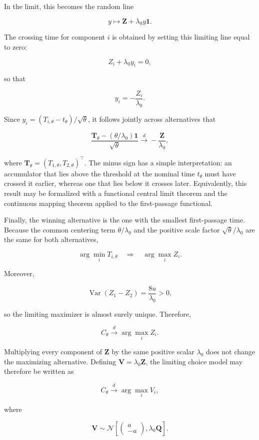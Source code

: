\documentclass[
  man,
  floatsintext,
  longtable,
  a4paper,
  nolmodern,
  notxfonts,
  notimes,
  colorlinks=true,linkcolor=blue,citecolor=blue,urlcolor=blue]{apa7}
\begin{document}
In the limit, this becomes the random line

\[
y\mapsto
\mathbf Z+\lambda_0y\mathbf 1.
\]

The crossing time for component \(i\) is obtained by setting this
limiting line equal to zero:

\[
Z_i+\lambda_0y_i=0,
\]

so that

\[
y_i=-\frac{Z_i}{\lambda_0}.
\]

Since \(y_i=(T_{i,\theta}-t_\theta)/\sqrt{\theta}\), it follows jointly
across alternatives that

\[
\frac{
\mathbf T_\theta-(\theta/\lambda_0)\mathbf 1
}{
\sqrt{\theta}
}
\xrightarrow{d}
-\frac{\mathbf Z}{\lambda_0},
\]

where \(\mathbf T_\theta=(T_{1,\theta},T_{2,\theta})^\top\). The minus
sign has a simple interpretation: an accumulator that lies above the
threshold at the nominal time \(t_\theta\) must have crossed it earlier,
whereas one that lies below it crosses later. Equivalently, this result
may be formalized with a functional central limit theorem and the
continuous mapping theorem applied to the first-passage functional.

Finally, the winning alternative is the one with the smallest
first-passage time. Because the common centering term
\(\theta/\lambda_0\) and the positive scale factor
\(\sqrt{\theta}/\lambda_0\) are the same for both alternatives,

\[
\arg\min_i T_{i,\theta}
\quad\Longrightarrow\quad
\arg\max_i Z_i.
\]

Moreover,

\[
\operatorname{Var}(Z_1-Z_2)
=
\frac{8u}{\lambda_0}
>0,
\]

so the limiting maximizer is almost surely unique. Therefore,

\[
C_\theta
\xrightarrow{d}
\arg\max_i Z_i.
\]

Multiplying every component of \(\mathbf Z\) by the same positive scalar
\(\lambda_0\) does not change the maximizing alternative. Defining
\(\mathbf V=\lambda_0\mathbf Z\), the limiting choice model may
therefore be written as

\[
C_\theta
\xrightarrow{d}
\arg\max_i V_i,
\]

where

\[
\mathbf V
\sim
\mathcal N
\left[
\begin{pmatrix}
a\\
-a
\end{pmatrix},
\lambda_0\mathbf Q
\right].
\]
\end{document}
